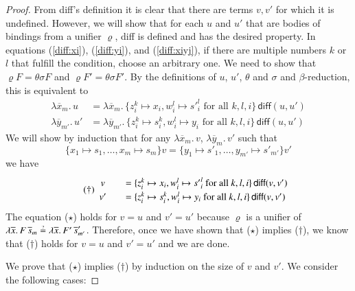 \begin{proof}
  From \textsf{diff}'s definition it is clear that there are terms $v,v'$ for which it is undefined.
  However, we will show that for each $u$ and $u'$ that are bodies of bindings from a unifier $\varrho$, 
  \textsf{diff} is defined and has the desired property.
  In equations (\ref{diff:xi}), (\ref{diff:yi}), and (\ref{diff:xiyj}), if there are multiple numbers $k$ or $l$
  that fulfill the condition, choose an arbitrary one.
  We need to show that $\varrho F = \theta\sigma F$ and $\varrho F' = \theta\sigma F'$.
  By the definitions of $u$, $u'$, $\theta$ and $\sigma$ and $\beta$-reduction, this is equivalent to
  \begin{align*}
    \lambda \overline{x}_m.\, u &= \lambda \overline{x}_m.\,
    \{z_i^k \mapsto x_i, w_i^l \mapsto {s'}_i^l \text{ for all }k,l,i\}\,\textsf{diff}(u,u')\\
    \lambda \overline{y}_{m'}.\, u' &= \lambda \overline{y}_{m'}.\,
    \{z_i^k \mapsto s_i^k, w_i^l \mapsto y_i \text{ for all }k,l,i\}\,\textsf{diff}(u,u')
  \end{align*}
  We will show by induction that for any $\lambda \overline{x}_m.\, v$, $\lambda \overline{y}_m.\, v'$ such that 
  \[\{x_1 \mapsto s_1, \ldots, x_m \mapsto  s_m\} v = \{y_1 \mapsto s'_1, \ldots, y_{m'} \mapsto  s'_{m'}\} v' \tag{$\star$}\]
  we have
  \begin{align*}
    \tag{\textdagger}
    \renewcommand{\arraystretch}{1.2}%
    \begin{array}{c@{\qquad}l}
      v &=
      \{z_i^k \mapsto x_i, w_i^l \mapsto {s'}_i^l \text{ for all }k,l,i\}\,\textsf{diff}(v,v')\\
      v' &=
      \{z_i^k \mapsto s_i^k, w_i^l \mapsto y_i \text{ for all }k,l,i\}\,\textsf{diff}(v,v')
    \end{array}
  \end{align*}
  The equation ($\star$) holds for $v = u$ and $v' = u'$ because
  $\varrho$ is a unifier of
  $\lambda
  \overline{x}.\, F \, \overline{s}_m \unif \lambda\overline{x}.\, F' \,
  \overline{s}'_{m'}$.
  Therefore, once we have shown that ($\star$) implies ($\dagger$),
  we know that ($\dagger$) holds for $v = u$ and $v' = u'$ and we are done.
  
  We prove that ($\star$) implies ($\dagger$) by induction on the size of $v$ and $v'$. We consider
  the following cases: 


\end{proof}

